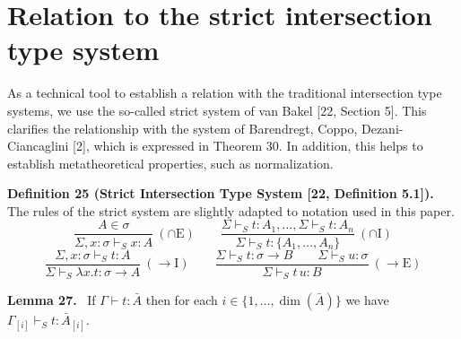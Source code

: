 \documentclass[10pt,a4paper]{article}
\newcommand{\Av}{\bar A}\newcommand{\Bv}{\bar B}\newcommand{\Cv}{\bar C}
\newcommand{\dimn}{\operatorname{dim}}
\newcommand{\pmstrictjudgment}[3]{#1\vdash_S #2:#3}
\newcommand{\orig}[2]{\par\medskip\noindent\textbf{#1 #2.}\ }
\begin{document}
\section*{Relation to the strict intersection type system}
As a technical tool to establish a relation with the traditional intersection type systems, we use the so-called strict system of van Bakel [22, Section 5]. This clarifies the relationship with the system of Barendregt, Coppo, Dezani-Ciancaglini [2], which is expressed in Theorem 30. In addition, this helps to establish metatheoretical properties, such as normalization.
\orig{Definition}{25 (Strict Intersection Type System [22, Definition 5.1])}
The rules of the strict system are slightly adapted to notation used in this paper.
\[\frac{A\in\sigma}{\pmstrictjudgment{\Sigma,x:\sigma}{x}{A}}\ (\cap\mathrm E)\qquad
\frac{\pmstrictjudgment\Sigma t{A_1},\ldots,\pmstrictjudgment\Sigma t{A_n}}{\pmstrictjudgment\Sigma t{\{A_1,\ldots,A_n\}}}\ (\cap\mathrm I)\]
\[\frac{\pmstrictjudgment{\Sigma,x:\sigma}t A}{\pmstrictjudgment\Sigma{\lambda x.t}{\sigma\to A}}\ (\to\mathrm I)\qquad
\frac{\pmstrictjudgment\Sigma t{\sigma\to B}\qquad\pmstrictjudgment\Sigma u\sigma}{\pmstrictjudgment\Sigma{t\,u}B}\ (\to\mathrm E)\]
\orig{Lemma}{27} If $\Gamma\vdash t:\Av$ then for each $i\in\{1,\ldots,\dimn(\Av)\}$ we have $\pmstrictjudgment{\Gamma_{[i]}}t{\Av_{[i]}}$.
\end{document}

